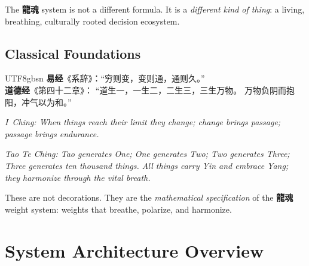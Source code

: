 \documentclass[conference]{IEEEtran}
\newcommand{\LH}{\textcolor{dragonRed}{\textbf{龍魂}}}
\newcommand{\IC}{\textcolor{goldYellow}{\textbf{易经}}}
\newcommand{\TCH}{\textcolor{jadeGreen}{\textbf{道德经}}}
\begin{document}
The \LH{} system is not a different formula.
It is a \emph{different kind of thing}:
a living, breathing, culturally rooted decision ecosystem.

\subsection{Classical Foundations}

\begin{CJK}{UTF8}{gbsn}
\IC{}《系辞》：``穷则变，变则通，通则久。''\\
\TCH{}《第四十二章》：
``道生一，一生二，二生三，三生万物。
万物负阴而抱阳，冲气以为和。''
\end{CJK}

\noindent\textit{I~Ching: When things reach their limit
they change; change brings passage; passage brings
endurance.}

\noindent\textit{Tao Te Ching: Tao generates One; One
generates Two; Two generates Three; Three generates ten
thousand things. All things carry Yin and embrace Yang;
they harmonize through the vital breath.}

These are not decorations.
They are the \emph{mathematical specification}
of the \LH{} weight system: weights that breathe,
polarize, and harmonize.

\section{System Architecture Overview}
\end{document}
